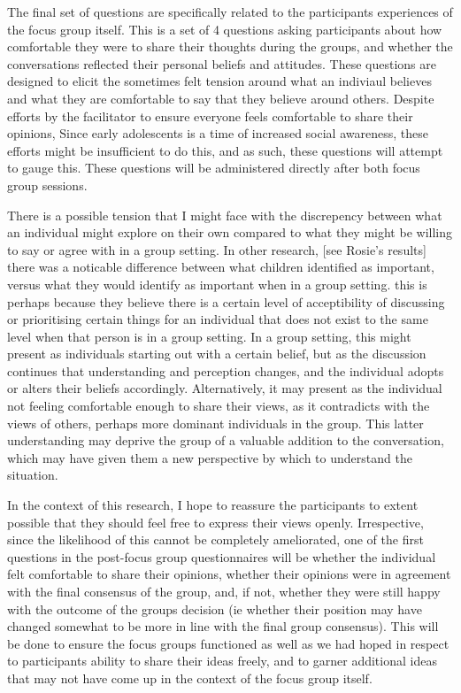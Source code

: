 The final set of questions are specifically related to the participants experiences of the focus group itself. This is a set of 4 questions asking participants about how comfortable they were to share their thoughts during the groups, and whether the conversations reflected their personal beliefs and attitudes. These questions are designed to elicit the sometimes felt tension around what an indiviaul believes and what they are comfortable to say that they believe around others. Despite efforts by the facilitator to ensure everyone feels comfortable to share their opinions, Since early adolescents is a time of increased social awareness, these efforts might be insufficient to do this, and as such, these questions will attempt to gauge this. These questions will be administered directly after both focus group sessions. 

There is a possible tension that I might face with the discrepency between what an individual might explore on their own compared to what they might be willing to say or agree with in a group setting. In other research, [see Rosie's results] there was a noticable difference between what children identified as important, versus what they would identify as important when in a group setting. this is perhaps because they believe there is a certain level of acceptibility of discussing or prioritising certain things for an individual that does not exist to the same level when that person is in a group setting. In a group setting, this might present as individuals starting out with a certain belief, but as the discussion continues that understanding and perception changes, and the individual adopts or alters their beliefs accordingly. Alternatively, it may present as the individual not feeling comfortable enough to share their views, as it contradicts with the views of others, perhaps more dominant individuals in the group. This latter understanding may deprive the group of a valuable addition to the conversation, which may have given them a new perspective by which to understand the situation. 


In the context of this research, I hope to reassure the participants to extent possible that they should feel free to express their views openly. Irrespective, since the likelihood of this cannot be completely ameliorated, one of the first questions in the post-focus group questionnaires will be whether the individual felt comfortable to share their opinions, whether their opinions were in agreement with the final consensus of the group, and, if not, whether they were still happy with the outcome of the groups decision (ie whether their position may have changed somewhat to be more in line with the final group consensus). This will be done to ensure the focus groups functioned as well as we had hoped in respect to participants ability to share their ideas freely, and to garner additional ideas that may not have come up in the context of the focus group itself. 

